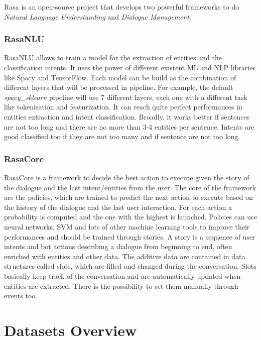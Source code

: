 \documentclass[11pt,a4paper]{article}
\begin{document}
Rasa is an open-source project that develops two powerful frameworks to do \textit{Natural Language Understanding} and \textit{Dialogue Management}. 

\subsubsection{RasaNLU}

RasaNLU allows to train a model for the extraction of entities and the classification intents. It uses the power of different existent ML and NLP libraries like Spacy and TensorFlow. Each model can be build as the combination of different layers that will be processed in pipeline. For example, the default \textit{spacy\_sklearn} pipeline will use 7 different layers, each one with a different task like tokenisation and featurization. It can reach quite perfect performances in entities extraction and intent classification. Broadly, it works better if sentences are not too long and there are no more than 3-4 entities per sentence. Intents are good classified too if they are not too many and if sentence are not too long.

\subsubsection{RasaCore}

RasaCore is a framework to decide the best action to execute given the story of the dialogue and the last intent/entities from the user. The core of the framework are the policies, which are trained to predict the next action to execute based on the history of the dialogue and the last user interaction. For each action a probability is computed and the one with the highest is launched. Policies can use neural networks, SVM and lots of other machine learning tools to improve their performances and should be trained through stories. A story is a sequence of user intents and bot actions describing a dialogue from beginning to end, often enriched with entities and other data. The additive data are contained in data structures called slots, which are filled and changed during the conversation. Slots basically keep track of the conversation and are automatically updated when entities are extracted. There is the possibility to set them manually through events too.

\section{Datasets Overview}
\end{document}
